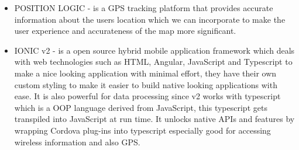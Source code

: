 \begin{itemize}
	\item POSITION LOGIC - is a GPS tracking platform that provides accurate information about the users location which we can incorporate to make the user experience and accurateness of the map more significant.
	
	
	\item IONIC v2 - is a open source hybrid mobile application framework which deals with web technologies such as HTML, Angular, JavaScript and Typescript to make a nice looking application with minimal effort, they have their own custom styling to make it easier to build native looking applications with ease. It is also powerful for data processing since v2 works with typescript which is a OOP language derived from JavaScript, this typescript gets transpiled into JavaScript at run time. It unlocks native APIs and features by wrapping Cordova plug-ins into typescript especially good for accessing wireless information and also GPS.
	
	
	
\end{itemize}
